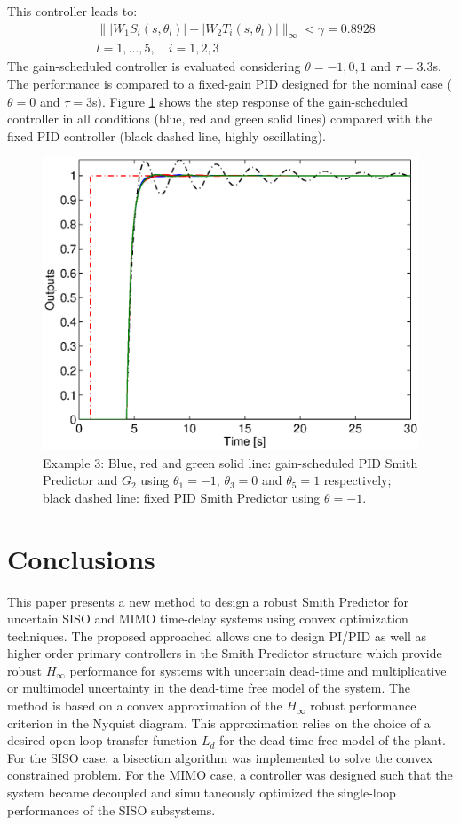 \documentclass[default]{svmult}
\begin{document}
This controller leads to:
\begin{align}
&\|  |W_1S_i(s,\theta_l)| + |W_2T_i(s,\theta_l)| \|_{\infty}<\gamma=0.8928\\ \nonumber
&l=1,\ldots,5, \quad i=1,2,3
\end{align}
The gain-scheduled controller is evaluated considering $\theta=-1,0,1$ and $\tau=3.3$s. The performance is compared to a fixed-gain PID designed for the nominal case ($\theta=0$ and $\tau= 3$s). Figure \ref{fig:example2} shows the step response of the gain-scheduled controller in all conditions (blue, red and green solid lines) compared with the fixed PID controller (black dashed line, highly oscillating). 
\begin{figure}[H]
\centering
\includegraphics[scale=0.4]{fig/exampleLPV_min_gamma}
\caption{Example 3: Blue, red and green solid line: gain-scheduled PID Smith Predictor and $G_2$ using  $\theta_1=-1$, $\theta_3=0$ and $\theta_5=1$ respectively;  black dashed line: fixed PID Smith Predictor using $\theta=-1$.}
\label{fig:example2}
\end{figure}%


\section{Conclusions}
This paper presents a new method to design a robust Smith Predictor for uncertain SISO and MIMO time-delay systems using convex optimization techniques. The proposed approached allows one to design PI/PID as well as higher order primary controllers in the Smith Predictor structure which provide robust $H_{\infty}$ performance for systems with uncertain dead-time and multiplicative or multimodel uncertainty in the dead-time free model of the system. The method is based on a convex approximation of the $H_\infty$ robust performance criterion in the Nyquist diagram. This approximation relies on the choice of a desired open-loop transfer function $L_d$ for the dead-time free model of the plant. For the SISO case, a bisection algorithm was implemented to solve the convex constrained problem. For the MIMO case, a controller was designed such that the system became decoupled and simultaneously optimized the single-loop performances of the SISO subsystems.
\end{document}
